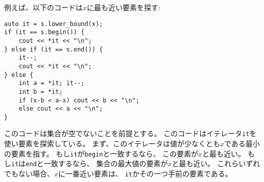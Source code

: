 \begin{samepage}
\begin{comment}
For example, the following code finds the element
nearest to $x$:
\end{comment}

例えば、以下のコードは$x$に最も近い要素を探す:

\begin{lstlisting}
auto it = s.lower_bound(x);
if (it == s.begin()) {
    cout << *it << "\n";
} else if (it == s.end()) {
    it--;
    cout << *it << "\n";
} else {
    int a = *it; it--;
    int b = *it;
    if (x-b < a-x) cout << b << "\n";
    else cout << a << "\n";
}
\end{lstlisting}

\begin{comment}
The code assumes that the set is not empty,
and goes through all possible cases
using an iterator \texttt{it}.
First, the iterator points to the smallest
element whose value is at least $x$.
If \texttt{it} equals \texttt{begin},
the corresponding element is nearest to $x$.
If \texttt{it} equals \texttt{end},
the largest element in the set is nearest to $x$.
If none of the previous cases hold,
the element nearest to $x$ is either the
element that corresponds to \texttt{it} or the previous element.
\end{comment}

このコードは集合が空でないことを前提とする。
このコードはイテレータ\texttt{it}を使い要素を探索している。
まず、このイテレータは値が少なくとも$x$である最小の要素を指す。
もし\texttt{it}が\texttt{begin}と一致するなら、
この要素が$x$と最も近い。
もし\texttt{it}は\texttt{end}と一致するなら、
集合の最大値の要素が$x$と最も近い。
これらいずれでもない場合、$x$に一番近い要素は、
\texttt{it}かその一つ手前の要素である。
\end{samepage}

\begin{comment}
\section{Other structures}

\subsubsection{Bitset}

\index{bitset}

A \key{bitset} is an array
whose each value is either 0 or 1.
For example, the following code creates
a bitset that contains 10 elements:
\end{comment}

